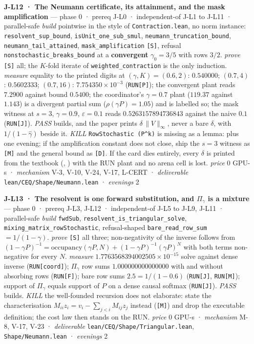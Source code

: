 \documentclass[11pt,a4paper]{article}
\theoremstyle{plain}
\theoremstyle{definition}
\theoremstyle{remark}
\begin{document}
\textbf{J-L12 · The Neumann certificate, its attainment, and the mask
amplification} --- phase 0 · prereq J-L0 · independent-of J-L1 to J-L11
· parallel-safe \emph{build} pointwise in the style of
\texttt{Contraction.lean}, no norm instance:
\texttt{resolvent\_sup\_bound}, \texttt{isUnit\_one\_sub\_smul},
\texttt{neumann\_truncation\_bound}, \texttt{neumann\_tail\_attained},
\texttt{mask\_amplification} \texttt{{[}S{]}}, refusal
\texttt{nonstochastic\_breaks\_bound} at a \textbf{convergent}
\(\gamma_0=3/5\) with rows \(3/2\). \emph{prove} \texttt{{[}S{]}} all;
the \(K\)-fold iterate of \texttt{weighted\_contraction} is the only
induction. \emph{measure} equality to the printed digits at
\((\gamma,K)=(0.6,2)\): \(0.540000\); \((0.7,4)\): \(0.5602333\);
\((0.7,16)\): \(7.754350\times10^{-3}\) (\texttt{RUN{[}P{]}}); the
convergent plant reads \(7.2900\) against bound \(0.5400\); the
coordinator's \(\gamma=0.7\) plant (\(119.37\) against \(1.143\)) is a
divergent partial sum (\(\rho(\gamma P)=1.05\)) and is labelled so; the
mask witness at \(s=3\), \(\gamma=0.9\), \(\varepsilon=0.1\) reads
\(0.5263157894736843\) against the naive \(0.1\) (\texttt{RUN{[}J{]}}).
\emph{PASS} builds, and the paper prints \(\delta\,\|V\|_\infty\), never
a bare \(\delta\), with \(1/(1-\hat\gamma)\) beside it. \emph{KILL}
\texttt{RowStochastic\ (P\^{}k)} is missing as a lemma: plus one
evening; if the amplification constant does not close, ship the \(s=3\)
witness as \texttt{{[}M{]}} and the general bound as \texttt{{[}D{]}}.
If the card dies entirely, every \(\delta\) is printed from the textbook
(\citep{meyer-2000-matrix}, \citep{horn-2013-matrix}) with the RUN plant
and no arena cell is lost. \emph{price} \(0\) GPU-s · \emph{mechanism}
V-3, V-10, V-24, V-17, L-CERT · \emph{deliverable}
\texttt{lean/CEQ/Shape/Neumann.lean} · \emph{evenings} 2

\textbf{J-L13 · The resolvent is one forward substitution, and
\(\Pi_\gamma\) is a mixture} --- phase 0 · prereq J-L3, J-L12 ·
independent-of J-L5 to J-L9, J-L11 · parallel-safe \emph{build}
\texttt{fwdSub}, \texttt{resolvent\_is\_triangular\_solve},
\texttt{mixing\_matrix\_rowStochastic}, refusal-shaped
\texttt{bare\_read\_row\_sum} \(=1/(1-\gamma)\). \emph{prove}
\texttt{{[}S{]}} all three; non-negativity of the inverse follows from
\((1-\gamma P)^{-1}=\mathrm{occupancy}(\gamma P,N)+(1-\gamma P)^{-1}(\gamma P)^N\)
with both terms non-negative for every \(N\). \emph{measure}
\(1.7763568394002505\times10^{-15}\) solve against dense inverse
(\texttt{RUN{[}coord{]}}); \(\Pi_\gamma\) row sums \(1.000000000000000\)
with and without absorbing rows (\texttt{RUN{[}F{]}}); bare row sums
\(2.5=1/(1-0.6)\) (\texttt{RUN{[}J{]}}, \texttt{RUN{[}M{]}}); support of
\(\Pi_\gamma\) equals support of \(P\) on a dense causal softmax
(\texttt{RUN{[}J{]}}). \emph{PASS} builds. \emph{KILL} the well-founded
recursion does not elaborate: state the characterisation
\(M_{ii}z_i=v_i-\sum_{j<i}M_{ij}z_j\) instead (\texttt{{[}M{]}}) and
drop the executable definition; the cost law then stands on the RUN.
\emph{price} \(0\) GPU-s · \emph{mechanism} M-8, V-17, V-23 ·
\emph{deliverable} \texttt{lean/CEQ/Shape/Triangular.lean},
\texttt{Shape/Neumann.lean} · \emph{evenings} 2
\end{document}

